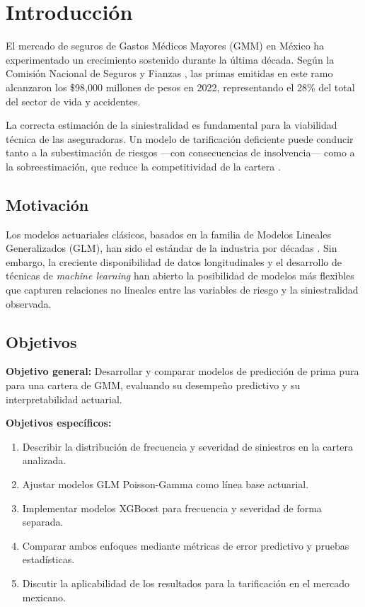 
\section{Introducción}
\label{sec:intro}

El mercado de seguros de Gastos Médicos Mayores (GMM) en México ha experimentado un crecimiento sostenido durante la última década. Según la Comisión Nacional de Seguros y Fianzas \citep{CNSF2023}, las primas emitidas en este ramo alcanzaron los \$98{,}000 millones de pesos en 2022, representando el 28\% del total del sector de vida y accidentes.

La correcta estimación de la siniestralidad es fundamental para la viabilidad técnica de las aseguradoras. Un modelo de tarificación deficiente puede conducir tanto a la subestimación de riesgos —con consecuencias de insolvencia— como a la sobreestimación, que reduce la competitividad de la cartera \citep{DeJong2008}.

\subsection{Motivación}

Los modelos actuariales clásicos, basados en la familia de Modelos Lineales Generalizados (GLM), han sido el estándar de la industria por décadas \citep{Nelder1972}. Sin embargo, la creciente disponibilidad de datos longitudinales y el desarrollo de técnicas de \textit{machine learning} han abierto la posibilidad de modelos más flexibles que capturen relaciones no lineales entre las variables de riesgo y la siniestralidad observada.

\subsection{Objetivos}

\textbf{Objetivo general:} Desarrollar y comparar modelos de predicción de prima pura para una cartera de GMM, evaluando su desempeño predictivo y su interpretabilidad actuarial.

\textbf{Objetivos específicos:}
\begin{enumerate}
  \item Describir la distribución de frecuencia y severidad de siniestros en la cartera analizada.
  \item Ajustar modelos GLM Poisson-Gamma como línea base actuarial.
  \item Implementar modelos XGBoost para frecuencia y severidad de forma separada.
  \item Comparar ambos enfoques mediante métricas de error predictivo y pruebas estadísticas.
  \item Discutir la aplicabilidad de los resultados para la tarificación en el mercado mexicano.
\end{enumerate}

